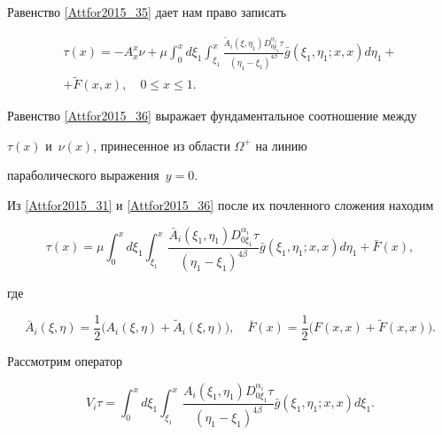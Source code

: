 Равенство \eqref{Attfor2015_35} дает нам право записать

\begin{multline}

\label{Attfor2015_36}

\tau(x)=-A_x^x \nu+\mu \int _0^x d\xi_1  \int _{\xi_1}^x

\frac{\widetilde{A}_i(\xi,\eta_1) D_{0\xi_1}^{\alpha_i}\tau}{(\eta_1-\xi_1)^{4\beta}}

\bar{g}(\xi_1,\eta_1;x,x)d\eta_1 + \\ +\widetilde{F}(x,x), \quad  0\leqslant x\leqslant 1.

\end{multline}



Равенство \eqref{Attfor2015_36} выражает фундаментальное соотношение между

$\tau(x)$ и~$\nu(x)$, принесенное из области $\Omega^+$ на линию 

параболического выражения~${y=0}$.



Из \eqref{Attfor2015_31} и \eqref{Attfor2015_36} после их почленного  сложения находим

\begin{equation}

\label{Attfor2015_37}

\tau(x)=\mu \int _0^x d\xi_1  \int _{\xi_1}^x

\frac{\bar{A}_i(\xi_1,\eta_1) D_{0\xi_1}^{\alpha_i}\tau}{(\eta_1-\xi_1)^{4\beta}}

\bar{g}(\xi_1,\eta_1;x,x)d\eta_1+\bar{F}(x),

\end{equation}

где

$$

\bar{A}_i(\xi,\eta)=\frac{1}{2}\bigl(A_i(\xi,\eta)+\widetilde{A}_i(\xi,\eta)\bigr),

\quad 

\bar{F}(x)=\frac{1}{2}\bigl( F(x,x)+\widetilde{F}(x,x)\bigr).

$$



Рассмотрим оператор

\begin{equation}

\label{Attfor2015_38}

V_i \tau= \int _0^x d\xi_1  \int _{\xi_1}^x

\frac{A_i(\xi_1,\eta_1) D_{0\xi_1}^{\alpha_i}\tau}{(\eta_1-\xi_1)^{4\beta}}

\bar{g}(\xi_1,\eta_1;x,x)d\xi_1.

\end{equation}

